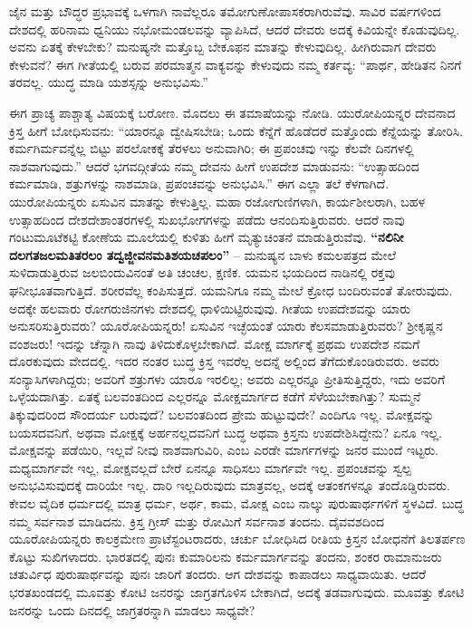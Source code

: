 ಜೈನ ಮತ್ತು ಬೌದ್ಧರ ಪ್ರಭಾವಕ್ಕೆ ಒಳಗಾಗಿ ನಾವೆಲ್ಲರೂ ತಮೋಗುಣೋಪಾಸಕರಾಗಿರು\-ವೆವು. ಸಾವಿರ ವರ್ಷಗಳಿಂದ ದೇಶದಲ್ಲಿ ಹರಿನಾಮ ಧ್ವನಿಯು ನಭೋಮಂಡಲವನ್ನು ವ್ಯಾಪಿಸಿದೆ, ಆದರೆ ದೇವರು ಅದಕ್ಕೆ ಕಿವಿಯನ್ನೇ ಕೊಡುವುದಿಲ್ಲ. ಅವನು ಏತಕ್ಕೆ ಕೇಳಬೇಕು? ಮನುಷ್ಯನೇ ಮತ್ತೊಬ್ಬ ಬೇಕೂಫನ ಮಾತನ್ನು ಕೇಳುವುದಿಲ್ಲ. ಹೀಗಿರುವಾಗ ದೇವರು ಕೇಳುವನೆ? ಈಗ ಗೀತೆಯಲ್ಲಿ ಬರುವ ಪರಮಾತ್ಮನ ವಾಕ್ಯವನ್ನು ಕೇಳುವುದು ನಮ್ಮ ಕರ್ತವ್ಯ: “ಪಾರ್ಥ, ಹೇಡಿತನ ನಿನಗೆ ತರವಲ್ಲ. ಯುದ್ಧ ಮಾಡಿ ಯಶಸ್ಸನ್ನು ಅನುಭವಿಸು.”

ಈಗ ಪ್ರಾಚ್ಯ ಪಾಶ್ಚಾತ್ಯ ವಿಷಯಕ್ಕೆ ಬರೋಣ. ಮೊದಲು ಈ ತಮಾಷೆಯನ್ನು ನೋಡಿ. ಯುರೋಪಿಯನ್ನರ ದೇವನಾದ ಕ್ರಿಸ್ತ ಹೀಗೆ ಬೋಧಿಸುವನು: “ಯಾರನ್ನೂ ದ್ವೇಷಿಸಬೇಡಿ; ಒಂದು ಕೆನ್ನೆಗೆ ಹೊಡೆದರೆ ಮತ್ತೊಂದು ಕೆನ್ನೆಯನ್ನು ತೋರಿಸಿ. ಕರ್ಮ\-ಗಿರ್ಮವನ್ನೆಲ್ಲ ಬಿಟ್ಟು ಪರಲೋಕಕ್ಕೆ ತೆರಳಲು ಅನುವಾಗಿರಿ; ಈ ಪ್ರಪಂಚವು ಇನ್ನು ಕೆಲವೇ ದಿನಗಳಲ್ಲಿ ನಾಶವಾಗುವುದು.” ಆದರೆ ಭಗವದ್ಗೀತೆಯ ನಮ್ಮ ದೇವನು ಹೀಗೆ ಉಪದೇಶ ಮಾಡುವನು: “ಉತ್ಸಾಹದಿಂದ ಕರ್ಮಮಾಡಿ, ಶತ್ರುಗಳನ್ನು ನಾಶಮಾಡಿ, ಪ್ರಪಂಚವನ್ನು ಅನುಭವಿಸಿ.” ಈಗ ಎಲ್ಲಾ ತಲೆ ಕೆಳಗಾಗಿದೆ. ಯುರೋಪಿಯನ್ನರು ಏಸುವಿನ ಮಾತನ್ನು ಕೇಳುತ್ತಿಲ್ಲ. ಮಹಾ ರಜೋಗುಣಿಗಳಾಗಿ, ಕಾರ್ಯಶೀಲರಾಗಿ, ಬಹಳ ಉತ್ಸಾಹದಿಂದ ದೇಶದೇಶಾಂತರಗಳಲ್ಲಿ ಸುಖಭೋಗಗಳನ್ನು ಪಡೆದು ಆನಂದಿಸುತ್ತಿರುವರು. ಆದರೆ ನಾವು ಗಂಟುಮೂಟೆಕಟ್ಟಿ ಕೋಣೆಯ ಮೂಲೆಯಲ್ಲಿ ಕುಳಿತು ಹೀಗೆ ಮೃತ್ಯುಚಿಂತನೆ ಮಾಡುತ್ತಿರುವೆವು. \textbf{“ನಲಿನೀ ದಲಗತಜಲಮತಿತರಲಂ ತದ್ವಜ್ಜೀವನಮತಿಶಯಚಪಲಂ”} – ಮನುಷ್ಯನ ಬಾಳು ಕಮಲಪತ್ರದ ಮೇಲೆ ಸುಳಿದಾಡುತ್ತಿರುವ ಜಲಬಿಂದುವಿನಂತೆ ಅತಿ ಚಂಚಲ, ಕ್ಷಣಿಕ. ಯಮನ ಭಯದಿಂದ ನಾಡಿನಲ್ಲಿ ರಕ್ತವು ಘನೀಭೂತವಾಗುತ್ತಿದೆ. ಶರೀರವೆಲ್ಲ ಕಂಪಿಸುತ್ತದೆ. ಯಮನಿಗೂ ನಮ್ಮ ಮೇಲೆ ಕ್ರೋಧ ಬಂದಿರುವಂತೆ ತೋರುವುದು. ಅದಕ್ಕೇ ಹಲವಾರು ರೋಗರುಜಿನಗಳು ದೇಶದಲ್ಲಿ ಧಾಳಿಯಿಟ್ಟಿರುವುವು. ಗೀತೆಯ ಉಪದೇಶವನ್ನು ಯಾರು ಅನುಸರಿಸುತ್ತಿರುವರು? ಯೂರೋಪಿಯನ್ನರು! ಏಸುವಿನ ಇಚ್ಛೆಯಂತೆ ಯಾರು ಕೆಲಸಮಾಡುತ್ತಿರುವರು? ಶ‍್ರೀಕೃಷ್ಣನ ವಂಶಜರು! ಇದನ್ನು ಚೆನ್ನಾಗಿ ನಾವು ತಿಳಿದುಕೊಳ್ಳಬೇಕಾಗಿದೆ. ಮೋಕ್ಷ ಮಾರ್ಗಕ್ಕೆ ಪ್ರಥಮ ಉಪದೇಶ ನಮಗೆ ದೊರಕುವುದು ವೇದದಲ್ಲಿ. ಇದರ ನಂತರ ಬುದ್ಧ ಕ್ರಿಸ್ತ ಇವರೆಲ್ಲ ಅದನ್ನೆ ಅಲ್ಲಿಂದ ತೆಗೆದುಕೊಂಡಿರುವರು. ಅವರು ಸಂನ್ಯಾಸಿಗಳಾಗಿದ್ದರು; ಅವರಿಗೆ ಶತ್ರುಗಳು ಯಾರೂ ಇರಲಿಲ್ಲ; ಅವರು ಎಲ್ಲರನ್ನೂ ಪ್ರೀತಿಸುತ್ತಿದ್ದರು, ಇದು ಅವರಿಗೆ ಒಳ್ಳೆಯದಾಗಿತ್ತು. ಏತಕ್ಕೆ ಬಲವಂತದಿಂದ ಎಲ್ಲರನ್ನೂ ಮೋಕ್ಷಮಾರ್ಗದ ಕಡೆಗೆ ಸೆಳೆಯಬೇಕಾಗಿತ್ತು? ಸುಮ್ಮನೆ ತಿಕ್ಕುವುದರಿಂದ ಸೌಂದರ್ಯ ಬರುವುದೆ? ಬಲವಂತದಿಂದ ಪ್ರೇಮ ಹುಟ್ಟುವುದೇ? ಎಂದಿಗೂ ಇಲ್ಲ. ಮೋಕ್ಷವನ್ನು ಬಯಸದವನಿಗೆ, ಅಥವಾ ಮೋಕ್ಷಕ್ಕೆ ಅರ್ಹನಲ್ಲದವನಿಗೆ ಬುದ್ಧ ಅಥವಾ ಕ್ರಿಸ್ತನು ಉಪದೇಶಿಸಿದ್ದೇನು? ಏನೂ ಇಲ್ಲ. ಮೋಕ್ಷವನ್ನು ಪಡೆಯಿರಿ, ಇಲ್ಲವೆ ನೀವು ನಾಶವಾಗುವಿರಿ, ಎಂಬ ಎರಡೇ ಮಾರ್ಗಗಳನ್ನು ಜನರ ಮುಂದೆ ಇಟ್ಟರು. ಮಧ್ಯಮಾರ್ಗವೇ ಇಲ್ಲ, ಮೋಕ್ಷವಲ್ಲದೆ ಬೇರೆ ಏನನ್ನೂ ಸಾಧಿಸಲು ಮಾರ್ಗವೇ ಇಲ್ಲ. ಪ್ರಪಂಚವನ್ನು ಸ್ವಲ್ಪ ಅನುಭವಿಸುವುದಕ್ಕೆ ದಾರಿಯೇ ಇಲ್ಲ. ದಾರಿ ಇಲ್ಲದಿರುವುದು ಮಾತ್ರವಲ್ಲ, ಅದಕ್ಕೆ ಆತಂಕಗಳನ್ನೂ ತಂದೊಡ್ಡಿರುವರು. ಕೇವಲ ವೈದಿಕ ಧರ್ಮದಲ್ಲಿ ಮಾತ್ರ ಧರ್ಮ, ಅರ್ಥ, ಕಾಮ, ಮೋಕ್ಷ ಎಂಬ ನಾಲ್ಕು ಪುರುಷಾರ್ಥಗಳಿಗೆ ಸ್ಥಳವಿದೆ. ಬುದ್ಧ ನಮ್ಮ ಸರ್ವನಾಶ ಮಾಡಿದನು. ಕ್ರಿಸ್ತ ಗ್ರೀಸ್​ ಮತ್ತು ರೋಮಿಗೆ ಸರ್ವನಾಶ ತಂದನು. ದೈವವಶದಿಂದ ಯೂರೋಪಿಯನ್ನರು ಕಾಲಕ್ರಮೇಣ ಪ್ರಾಟೆಸ್ಟಂಟರಾದರು, ಚರ್ಚು ಬೋಧಿಸಿದ ರೀತಿಯ ಕ್ರಿಸ್ತನ ಬೋಧನೆಗೆ ತಿಲತರ್ಪಣ ಕೊಟ್ಟು ಸುಖಿಗಳಾದರು. ಭಾರತದಲ್ಲಿ ಪುನಃ ಕುಮಾರಿಲನು ಕರ್ಮಮಾರ್ಗವನ್ನು ತಂದನು, ಶಂಕರ ರಾಮಾನುಜರು ಚತುರ್ವಿಧ ಪುರುಷಾರ್ಥವನ್ನು ಪುನಃ ಜಾರಿಗೆ ತಂದರು. ಆಗ ದೇಶವನ್ನು ಕಾಪಾಡಲು ಸಾಧ್ಯವಾಯಿತು. ಆದರೆ ಭರತಖಂಡದಲ್ಲಿ ಮೂವತ್ತು ಕೋಟಿ ಜನರನ್ನು ಜಾಗ್ರತಗೊಳಿಸ ಬೇಕಾಗಿದೆ, ಅದಕ್ಕೆ ತಡವಾಗು\-ವುದು. ಮೂವತ್ತು ಕೋಟಿ ಜನರನ್ನು ಒಂದು ದಿನದಲ್ಲಿ ಜಾಗ್ರತರನ್ನಾಗಿ ಮಾಡಲು ಸಾಧ್ಯವೇ?

